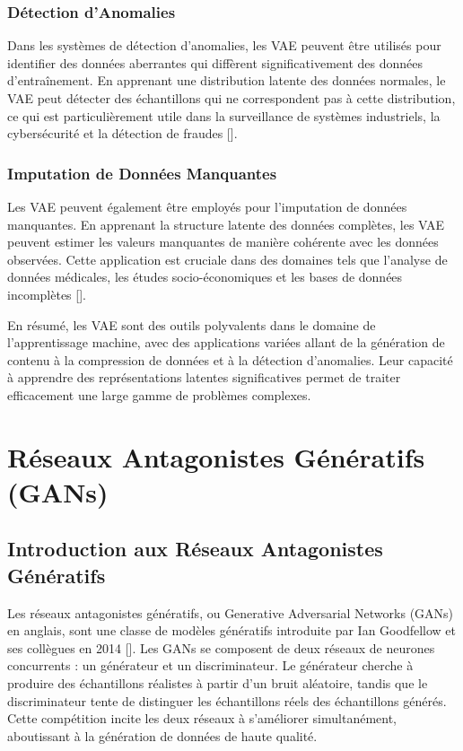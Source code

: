 \subsubsection{Détection d'Anomalies}

Dans les systèmes de détection d'anomalies, les VAE peuvent être utilisés pour
identifier des données aberrantes qui diffèrent significativement des données
d'entraînement. En apprenant une distribution latente des données normales, le
VAE peut détecter des échantillons qui ne correspondent pas à cette
distribution, ce qui est particulièrement utile dans la surveillance de
systèmes industriels, la cybersécurité et la détection de fraudes
	[\cite{wang2019revisiting}].

\subsubsection{Imputation de Données Manquantes}

Les VAE peuvent également être employés pour l'imputation de données
manquantes. En apprenant la structure latente des données complètes, les VAE
peuvent estimer les valeurs manquantes de manière cohérente avec les données
observées. Cette application est cruciale dans des domaines tels que l'analyse
de données médicales, les études socio-économiques et les bases de données
incomplètes [\cite{collier2020vaes}].

En résumé, les VAE sont des outils polyvalents dans le domaine de
l'apprentissage machine, avec des applications variées allant de la génération
de contenu à la compression de données et à la détection d'anomalies. Leur
capacité à apprendre des représentations latentes significatives permet de
traiter efficacement une large gamme de problèmes complexes.

\section{Réseaux Antagonistes Génératifs (GANs)}

\subsection{Introduction aux Réseaux Antagonistes Génératifs}

Les réseaux antagonistes génératifs, ou Generative Adversarial Networks (GANs)
en anglais, sont une classe de modèles génératifs introduite par Ian Goodfellow
et ses collègues en 2014 [\cite{goodfellow2014generative}]. Les GANs se
composent de deux réseaux de neurones concurrents : un générateur et un
discriminateur. Le générateur cherche à produire des échantillons réalistes à
partir d'un bruit aléatoire, tandis que le discriminateur tente de distinguer
les échantillons réels des échantillons générés. Cette compétition incite les
deux réseaux à s'améliorer simultanément, aboutissant à la génération de
données de haute qualité.

